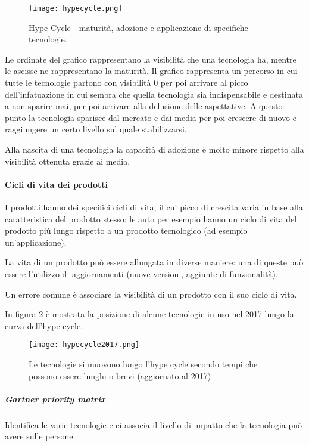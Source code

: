 \begin{figure}[H]
\centering
\texttt{[image: hypecycle.png]}
\caption[Grafico Hype Cycle]{Hype Cycle - maturità, adozione e applicazione di
specifiche tecnologie.}
\label{fig:hypecycle}
\end{figure}

Le ordinate del grafico rappresentano la visibilità che una tecnologia ha,
mentre le ascisse ne rappresentano la maturità.
Il grafico rappresenta un percorso in cui tutte le tecnologie partono con
visibilità 0 per poi arrivare al picco dell'infatuazione in cui sembra che
quella tecnologia sia indispensabile e destinata a non sparire mai,
per poi arrivare alla delusione delle aspettative.
A questo punto la tecnologia sparisce dal mercato e dai media per poi crescere
di nuovo e raggiungere un certo livello sul quale stabilizzarsi.

Alla nascita di una tecnologia la capacità di adozione è molto minore rispetto
alla visibilità ottenuta grazie ai media.

\paragraph*{Cicli di vita dei prodotti} I prodotti hanno dei specifici cicli di
vita, il cui picco di crescita varia in base alla caratteristica del prodotto
stesso: le auto per esempio hanno un ciclo di vita del prodotto più lungo
rispetto a un prodotto tecnologico (ad esempio un'applicazione).

La vita di un prodotto può essere allungata in diverse maniere:
una di queste può essere l'utilizzo di aggiornamenti (nuove versioni,
aggiunte di funzionalità).

Un errore comune è associare la visibilità di un prodotto con il suo ciclo di
vita.

In figura \ref{fig:hypecycle2017} è mostrata la posizione di alcune tecnologie
in uso nel 2017 lungo la curva dell'hype cycle.

\begin{figure}[H]
\centering
\texttt{[image: hypecycle2017.png]}
\caption[Hype Cycle 2017]{Le tecnologie si muovono lungo l'hype cycle secondo
tempi che possono essere lunghi o brevi (aggiornato al 2017)}
\label{fig:hypecycle2017}
\end{figure}

\subparagraph*{Gartner priority matrix} Identifica le varie tecnologie e ci
associa il livello di impatto che la tecnologia può avere sulle persone.

